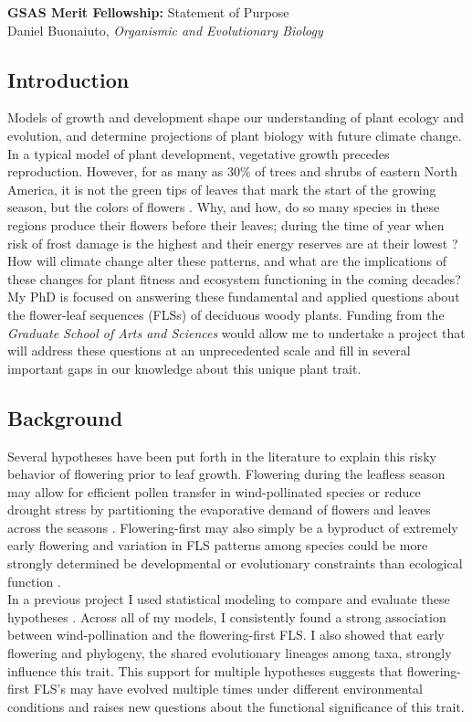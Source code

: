 \documentclass[11pt]{article}
\begin{document}
\noindent \textbf{GSAS Merit Fellowship:} Statement of Purpose\\
Daniel Buonaiuto, \textit{Organismic and Evolutionary Biology}
\subsection*{Introduction}
Models of growth and development shape our understanding of plant ecology and evolution, and determine projections of plant biology with future climate change. In a typical model of plant development, vegetative growth precedes reproduction. However, for as many as 30\% of trees and shrubs of eastern North America, it is not the green tips of leaves that mark the start of the growing season, but the colors of flowers \citep{Buonaiuto2020}. Why, and how, do so many species in these regions produce their flowers before their leaves; during the time of year when risk of frost damage is the highest \citep{Augspurger:2013aa} and their energy reserves are at their lowest \citep{Primack1987}? How will climate change alter these patterns, and what are the implications of these changes for plant fitness and ecosystem functioning in the coming decades?\\

My PhD is focused on answering these fundamental and applied questions about the flower-leaf sequences (FLSs) of deciduous woody plants. Funding from the \textit{Graduate School of Arts and Sciences} would allow me to undertake a project that will address these questions at an unprecedented scale and fill in several important gaps in our knowledge about this unique plant trait.
\subsection*{Background}
Several hypotheses have been put forth in the literature to explain this risky behavior of flowering prior to leaf growth. Flowering during the leafless season may allow for efficient pollen transfer in wind-pollinated species \citep{Rathcke_1985} or reduce drought stress by partitioning the evaporative demand of flowers and leaves across the seasons \citep{Gougherty2018}. Flowering-first may also simply be a byproduct of extremely early flowering \citep{Primack1987} and variation in FLS patterns among species could be more strongly determined be developmental or evolutionary constraints than ecological function \citep{Gougherty2018,Diggle1995}.\\

In a previous project I used statistical modeling to compare and evaluate these hypotheses \citep{Buonaiuto2020}. Across all of my models, I consistently found a strong association between wind-pollination and the flowering-first FLS. I also showed that early flowering and phylogeny, the shared evolutionary lineages among taxa, strongly influence this trait. This support for multiple hypotheses suggests that flowering-first FLS’s may have evolved multiple times under different environmental conditions and raises new questions about the functional significance of this trait.\\
\end{document}
